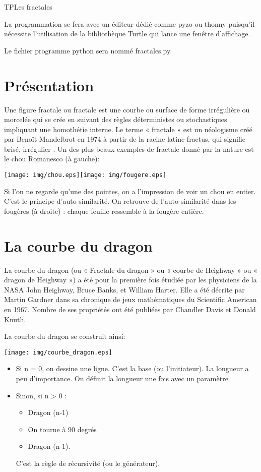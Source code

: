 \documentclass[11pt,a4paper]{article}
\begin{document}
\begin{NSI}
{TP}{Les fractales}
\end{NSI}

La programmation se fera avec un éditeur dédié comme pyzo ou thonny puisqu'il nécessite l'utilisation de la bibliothèque Turtle qui lance une fenêtre d'affichage.

Le fichier programme python sera nommé fractales.py

\section{Présentation}

Une figure fractale ou fractale est une courbe ou surface de forme irrégulière ou morcelée qui se
crée en suivant des règles déterministes ou stochastiques impliquant une homothétie interne. Le
terme « fractale » est un néologisme créé par Benoît Mandelbrot en 1974 à partir de la racine latine
fractus, qui signifie brisé, irrégulier .
Un des plus beaux exemples de fractale donné par la nature est le chou Romanesco (à gauche):

\begin{center}
\texttt{[image: img/chou.eps]}\hspace{1cm}\texttt{[image: img/fougere.eps]}
\end{center}
Si l'on ne regarde qu'une des pointes, on a l'impression de voir un chou en entier. C'est le principe
d'auto-similarité. On retrouve de l'auto-similarité dans les fougères (à droite) : chaque feuille
ressemble à la fougère entière.


\section{La courbe du dragon}
La courbe du dragon (ou « Fractale du dragon » ou « courbe de Heighway » ou « dragon de
Heighway ») a été pour la première fois étudiée par les physiciens de la NASA John Heighway,
Bruce Banks, et William Harter. Elle a été décrite par Martin Gardner dans sa chronique de jeux
mathématiques du Scientific American en 1967. Nombre de ses propriétés ont été publiées par
Chandler Davis et Donald Knuth.

La courbe du dragon se construit ainsi:
\begin{center}
\texttt{[image: img/courbe\_dragon.eps]}
\end{center}

\begin{itemize}
\item Si n = 0, on dessine une ligne. C'est la base (ou l'initiateur). La longueur a peu
d'importance. On définit la longueur une fois avec un paramètre.
\item Sinon, si n > 0 :
\begin{itemize}
\item Dragon (n-1)
\item On tourne à 90 degrés
\item Dragon (n-1). 
\end{itemize}
C'est la règle de récursivité (ou le générateur).
\end{itemize}
\end{document}
